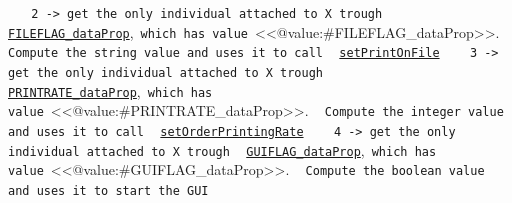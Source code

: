 \begin{description}
\begin{description}
\begin{description}
{\mbox{ }	\mbox{}\newline
\mbox{ }	\verb!2 -> get the only individual attached to X trough!\mbox{}\newline
\mbox{ }				\texttt{\hyperlink{ontologyFramework.OFRunning.OFInitialising.OFBuilderCommon.FILEFLAG_dataProp}{FILEFLAG_dataProp}},\mbox{ }\verb!which has value!\mbox{ }<<@value:#FILEFLAG_dataProp>>.\mbox{}\newline
\mbox{ }				\verb!Compute the string value and uses it to call!\mbox{}\newline
\mbox{ }				\texttt{\hyperlink{ontologyFramework.OFErrorManagement.OFDebugLogger.setPrintOnFile(java.lang.String)}{setPrintOnFile}}\mbox{}\newline
\mbox{ }\mbox{}\newline
\mbox{ }\mbox{ }\verb!3 -> get the only individual attached to X trough!\mbox{}\newline
\mbox{ }				\texttt{\hyperlink{ontologyFramework.OFRunning.OFInitialising.OFBuilderCommon.PRINTRATE_dataProp}{PRINTRATE_dataProp}},\mbox{ }\verb!which has value!\mbox{ }<<@value:#PRINTRATE_dataProp>>.\mbox{}\newline
\mbox{ }				\verb!Compute the integer value and uses it to call!\mbox{}\newline
\mbox{ }				\texttt{\hyperlink{ontologyFramework.OFErrorManagement.OFDebugLogger.setOrderPrintingRate(java.lang.Integer)}{setOrderPrintingRate}}\mbox{}\newline
\mbox{ }\mbox{}\newline
\mbox{ }\mbox{ }\verb!4 -> get the only individual attached to X trough!\mbox{}\newline
\mbox{ }				\texttt{\hyperlink{ontologyFramework.OFRunning.OFInitialising.OFBuilderCommon.GUIFLAG_dataProp}{GUIFLAG_dataProp}},\mbox{ }\verb!which has value!\mbox{ }<<@value:#GUIFLAG_dataProp>>.\mbox{}\newline
\mbox{ }				\verb!Compute the boolean value and uses it to start the GUI!\mbox{}\newline
\mbox{ }			\mbox{}\newline
\mbox{ }}

\end{description}
\end{description}
\end{description}
